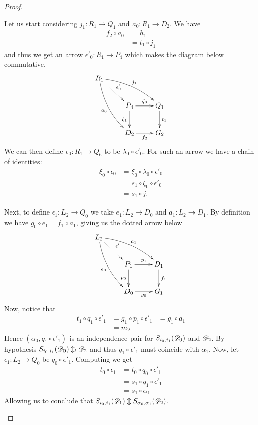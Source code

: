 \begin{proof}
\begin{enumerate}
Let us start considering $j_1\colon R_1\to Q_1$ and $a_0\colon R_1\to D_2$. We have
\begin{align*}
	f_2\circ a_0&=h_1\\&=t_1\circ j_1
\end{align*}
and thus we get an arrow $\epsilon'_0\colon R_1\to P_4$ which makes the diagram below commutative.
			\[\xymatrix{R_1 \ar@{.>}[dr]^{\epsilon'_0} \ar@/^.3cm/[drr]^{j_1} \ar@/_.3cm/[ddr]_{a_0}\\ &P_4 \ar[r]^{\zeta_0} \ar[d]_{\zeta_1}& Q_1 \ar[d]^{t_1}\\ &D_2\ar[r]_{f_2} & G_2}\] 
We can then define $\epsilon_0\colon R_1\to Q_6$ to be $\lambda_0\circ \epsilon'_0$. For such an arrow we have a chain of identities:
\begin{align*}
	\xi_0\circ \epsilon_0&=\xi_0\circ \lambda_0\circ \epsilon'_0\\&=s_1\circ \zeta_0 \circ \epsilon'_0\\&=s_1\circ j_1
\end{align*}

Next, to define $\epsilon_1\colon L_2\to Q_0$ we take $e_1\colon L_2 \to D_0$ and $a_1\colon L_2\to D_1$. By definition we have $	g_0\circ e_1=f_1\circ a_1$, giving us the dotted arrow below
	\[\xymatrix{L_2 \ar@{.>}[dr]^{\epsilon'_1} \ar@/^.3cm/[drr]^{a_1} \ar@/_.3cm/[ddr]_{e_0}\\ &P_1 \ar[r]^{p_1} \ar[d]_{p_0}& D_1 \ar[d]^{f_1}\\ &D_0\ar[r]_{g_0} & G_1}\] 
Now, notice that 
\begin{align*}
	t_1\circ q_1\circ \epsilon'_1&=g_1\circ p_1\circ \epsilon'_1&=g_1\circ a_1\\&=m_2
\end{align*}
Hence $(\alpha_0, q_1\circ \epsilon'_1)$ is an independence pair for $S_{i_0, i_1}(\mathscr{D}_0)$ and $\mathscr{D}_2$. By hypothesis $S_{i_0, i_1}(\mathscr{D}_0)\updownarrow_! \mathscr{D}_2$ and thus $q_1\circ \epsilon'_1$ must coincide with $\alpha_1$. Now, let $\epsilon_1\colon L_2\to Q_0$ be $q_0\circ \epsilon'_1$. Computing we get
\begin{align*}
t_0\circ \epsilon_1&= t_0\circ q_0\circ \epsilon'_1\\&=s_1\circ q_1\circ \epsilon'_1\\&=s_1\circ \alpha_1
\end{align*}
Allowing us to conclude that  $S_{i_0,i_1}(\mathscr{D}_1)\updownarrow S_{\alpha_0, \alpha_1}(\mathscr{D}_2)$.
\qedhere 
			\end{enumerate}
\end{proof}


